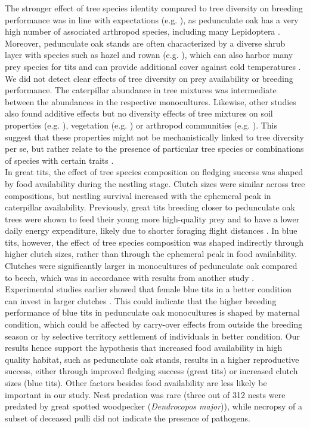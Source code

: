 \documentclass[10pt, twoside]{book} %
\begin{document}
	The stronger effect of tree species identity compared to tree diversity on breeding performance was in line with expectations (e.g. \citealt{Naef-Daenzer2000, Shutt2018}), as pedunculate oak has a very high number of associated arthropod species, including many Lepidoptera \citep{Kennedy1984, Brandle2001}. Moreover, pedunculate oak stands are often characterized by a diverse shrub layer with species such as hazel and rowan (e.g. \citealt{DeGroote2018}), which can also harbor many prey species for tits and can provide additional cover against cold temperatures \citep{Latimer2017}. We did not detect clear effects of tree diversity on prey availability or breeding performance. The caterpillar abundance in tree mixtures was intermediate between the abundances in the respective monocultures. Likewise, other studies also found additive effects but no diversity effects of tree mixtures on soil properties (e.g. \citealt{DeGroote2018}), vegetation (e.g. \citealt{Barsoum2016}) or arthropod communities (e.g. \citealt{Koricheva2006}). This suggest that these properties might not be mechanistically linked to tree diversity per se, but rather relate to the presence of particular tree species or combinations of species with certain traits \citep{Forrester2015}.\\ 
	
	In great tits, the effect of tree species composition on fledging success was shaped by food availability during the nestling stage. Clutch sizes were similar across tree compositions, but nestling survival increased with the ephemeral peak in caterpillar availability. Previously, great tits breeding closer to pedunculate oak trees were shown to feed their young more high-quality prey \citep{Wilkin2007a} and to have a lower daily energy expenditure, likely due to shorter foraging flight distances \citep{Hinsley2008}. In blue tits, however, the effect of tree species composition was shaped indirectly through higher clutch sizes, rather than through the ephemeral peak in food availability. Clutches were significantly larger in monocultures of pedunculate oak compared to beech, which was in accordance with results from another study \citep{Amininasab2016}. Experimental studies earlier showed that female blue tits in a better condition can invest in larger clutches \citep{Slagsvold1990}. This could indicate that the higher breeding performance of blue tits in pedunculate oak monocultures is shaped by maternal condition, which could be affected by carry-over effects from outside the breeding season or by selective territory settlement of individuals in better condition. Our results hence support the hypothesis that increased food availability in high quality habitat, such as pedunculate oak stands, results in a higher reproductive success, either through improved fledging success (great tits) or increased clutch sizes (blue tits). Other factors besides food availability are less likely be important in our study. Nest predation was rare (three out of 312 nests were predated by great spotted woodpecker (\textit{Dendrocopos major})), while necropsy of a subset of deceased pulli did not indicate the presence of pathogens.\\
	
\end{document}
